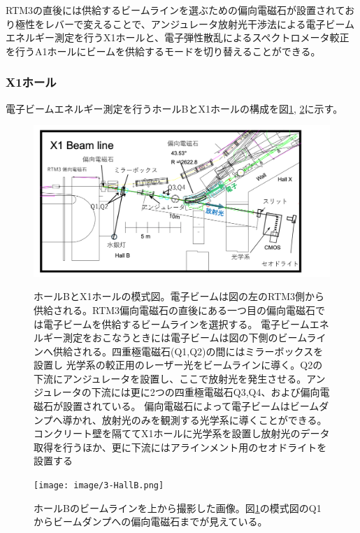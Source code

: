 \documentclass[a4paper,11pt,uplatex]{jsbook}
\begin{document}
RTM3の直後には供給するビームラインを選ぶための偏向電磁石が設置されており極性をレバーで変えることで、アンジュレータ放射光干渉法による電子ビームエネルギー測定を行うX1ホールと、電子弾性散乱によるスペクトロメータ較正を行うA1ホールにビームを供給するモードを切り替えることができる。

\subsubsection{X1ホール}
電子ビームエネルギー測定を行うホールBとX1ホールの構成を図\ref{X1}, \ref{X1-2}に示す。
\begin{figure}[H]
  \centering
  \includegraphics[width=\linewidth]{image/3-X1.png}\\
  \caption[ホールBとX1ホールの模式図]{ホールBとX1ホールの模式図。電子ビームは図の左のRTM3側から供給される。RTM3偏向電磁石の直後にある一つ目の偏向電磁石では電子ビームを供給するビームラインを選択する。
  電子ビームエネルギー測定をおこなうときには電子ビームは図の下側のビームラインへ供給される。四重極電磁石(Q1,Q2)の間にはミラーボックスを設置し
  光学系の較正用のレーザー光をビームラインに導く。Q2の下流にアンジュレータを設置し、ここで放射光を発生させる。アンジュレータの下流には更に2つの四重極電磁石Q3,Q4、および偏向電磁石が設置されている。
  偏向電磁石によって電子ビームはビームダンプへ導かれ、放射光のみを観測する光学系に導くことができる。コンクリート壁を隔ててX1ホールに光学系を設置し放射光のデータ取得を行うほか、更に下流にはアラインメント用のセオドライトを設置する}
  \label{X1}
\end{figure}
\begin{figure}[H]
  \centering
  \texttt{[image: image/3-HallB.png]}\\
  \caption[ホールBの写真]{ホールBのビームラインを上から撮影した画像。図\ref{X1}の模式図のQ1からビームダンプへの偏向電磁石までが見えている。}
  \label{X1-2}
\end{figure}
\end{document}
